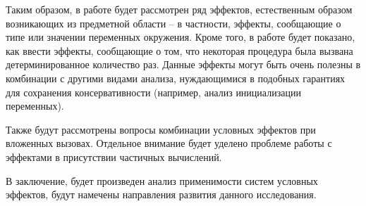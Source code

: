 Таким образом, в работе будет рассмотрен ряд эффектов, естественным образом возникающих из предметной области -- в частности, эффекты, сообщающие о типе или значении переменных окружения. Кроме того, в работе будет показано, как ввести эффекты, сообщающие о том, что некоторая процедура была вызвана детерминированное количество раз. Данные эффекты могут быть очень полезны в комбинации с другими видами анализа, нуждающимися в подобных гарантиях для сохранения консервативности (например, анализ инициализации переменных).

Также будут рассмотрены вопросы комбинации условных эффектов при вложенных вызовах. Отдельное внимание будет уделено проблеме работы с эффектами в присутствии частичных вычислений.

В заключение, будет произведен анализ применимости систем условных эффектов, будут намечены направления развития данного исследования.


